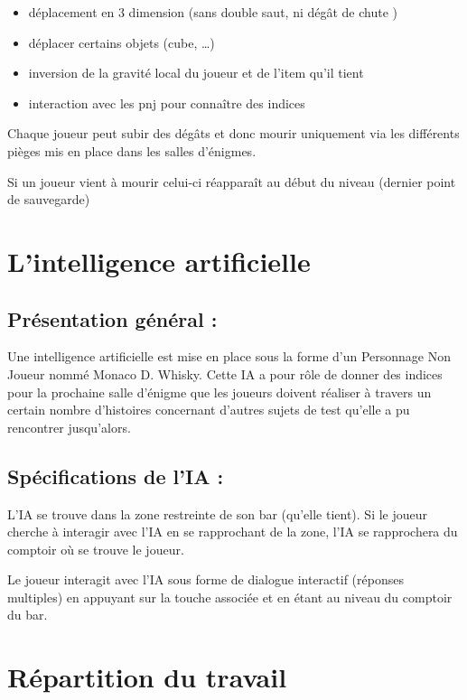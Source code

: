 \documentclass[a4paper,11pt]{article}
\begin{document}
\begin{itemize}
    \item déplacement en 3 dimension (sans double saut, ni dégât de chute )
    \item déplacer certains objets (cube, …)
    \item inversion de la gravité local du joueur et de l’item qu’il tient
    \item interaction avec les pnj pour connaître des indices \newline
\end{itemize}



Chaque joueur peut subir des dégâts et donc mourir uniquement via les différents pièges
 mis en place dans les salles d'énigmes.

Si un joueur vient à mourir celui-ci réapparaît au début du niveau (dernier point de sauvegarde) 

\section{L’intelligence artificielle}

\subsection{Présentation général :}

Une intelligence artificielle est mise en place sous la 
forme d’un Personnage Non Joueur nommé Monaco D. Whisky. 
Cette IA a pour rôle de donner des indices pour la prochaine salle d’énigme que les 
joueurs doivent réaliser à travers un certain nombre d’histoires concernant d’autres sujets de 
test qu’elle a pu rencontrer jusqu’alors.


\subsection{Spécifications de l’IA :}

L’IA se trouve dans la zone restreinte de son bar (qu’elle tient). Si le joueur cherche à 
interagir avec l’IA en se rapprochant de la zone, l’IA se rapprochera du comptoir où se trouve le joueur.\newline


Le joueur interagit avec l’IA sous forme de dialogue interactif (réponses multiples) 
en appuyant sur la touche associée et en étant au niveau du comptoir du bar.


\section{Répartition du travail}
\end{document}
